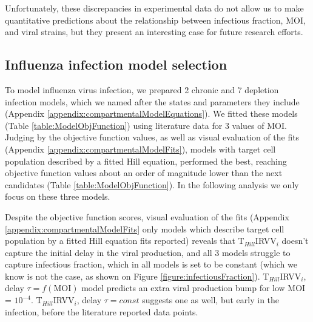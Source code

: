 Unfortunately, these discrepancies in experimental data do not allow us to make quantitative predictions about the relationship between infectious fraction, MOI, and viral strains, but they present an interesting case for future research efforts.

\subsection{Influenza infection model selection}

To model influenza virus infection, we prepared 2 chronic and 7 depletion infection models, which we named after the states and parameters they include (Appendix \ref{appendix:compartmentalModelEquations}). We fitted these models (Table \ref{table:ModelObjFunction}) using literature data \cite{rudiger2019multiscale, frensing2016influenza} for 3 values of MOI. Judging by the objective function values, as well as visual evaluation of the fits (Appendix \ref{appendix:compartmentalModelFits}), models with target cell population described by a fitted Hill equation, performed the best, reaching objective function values about an order of magnitude lower than the next candidates (Table \ref{table:ModelObjFunction}). In the following analysis we only focus on these three models.

Despite the objective function scores, visual evaluation of the fits (Appendix \ref{appendix:compartmentalModelFits} only models which describe target cell population by a fitted Hill equation fits reported) reveals that T$_{Hill}$IRVV$_i$ doesn't capture the initial delay in the viral production, and all 3 models struggle to capture infectious fraction, which in all models is set to be constant (which we know is not the case, as shown on Figure \ref{figure:infectiousFraction}). T$_{Hill}$IRVV$_i$, delay $\tau = f(\text{MOI})$ model predicts an extra viral production bump for low MOI = $10^{-4}$. T$_{Hill}$IRVV$_i$, delay $\tau = const$ suggests one as well, but early in the infection, before the literature reported data points.

